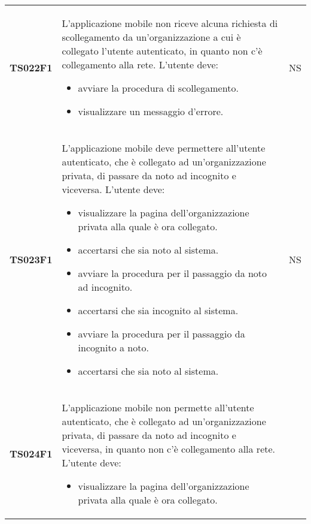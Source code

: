 \documentclass[../piano-di-qualifica.tex]{subfiles}
\begin{document}
\begin{centering}
\begin{longtable}[H]{>{\centering\bfseries}m{3cm} >{}p{10cm} >{\centering\arraybackslash}m{3cm}}
    TS022F1            & L'applicazione mobile non riceve alcuna richiesta di scollegamento da un'organizzazione a cui è collegato l'utente autenticato, in quanto non c'è collegamento alla rete. \newline
    L'utente deve:
    \begin{itemize}
      \item avviare la procedura di scollegamento.
      \item visualizzare un messaggio d'errore.
    \end{itemize}
                       & NS                                                                                                                                                                                                                                                               \\
    TS023F1            & L'applicazione mobile deve permettere all'utente autenticato, che è collegato ad un'organizzazione privata, di passare da noto ad incognito e viceversa. \newline
    L'utente deve:
    \begin{itemize}
      \item visualizzare la pagina dell'organizzazione privata alla quale è ora collegato.
      \item accertarsi che sia noto al sistema.
      \item avviare la procedura per il passaggio da noto ad incognito.
      \item accertarsi che sia incognito al sistema.
      \item avviare la procedura per il passaggio da incognito a noto.
      \item accertarsi che sia noto al sistema.
    \end{itemize}
                       & NS                                                                                                                                                                                                                                                               \\
    TS024F1            & L'applicazione mobile non permette all'utente autenticato, che è collegato ad un'organizzazione privata, di passare da noto ad incognito e viceversa, in quanto non c'è collegamento alla rete. \newline
    L'utente deve:
    \begin{itemize}
      \item visualizzare la pagina dell'organizzazione privata alla quale è ora collegato.

\end{itemize}
\end{longtable}
\end{centering}
\end{document}
